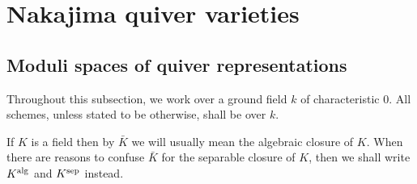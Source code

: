 \section{Nakajima quiver varieties}
    \subsection{Moduli spaces of quiver representations}
        \begin{convention}
            Throughout this subsection, we work over a ground field $k$ of characteristic $0$. All schemes, unless stated to be otherwise, shall be over $k$.
        \end{convention}
        \begin{convention}
            If $K$ is a field then by $\bar{K}$ we will usually mean the algebraic closure of $K$. When there are reasons to confuse $\bar{K}$ for the separable closure of $K$, then we shall write $K^{\mathrm{alg}}$ and $K^{\mathrm{sep}}$ instead. 
        \end{convention}
        
